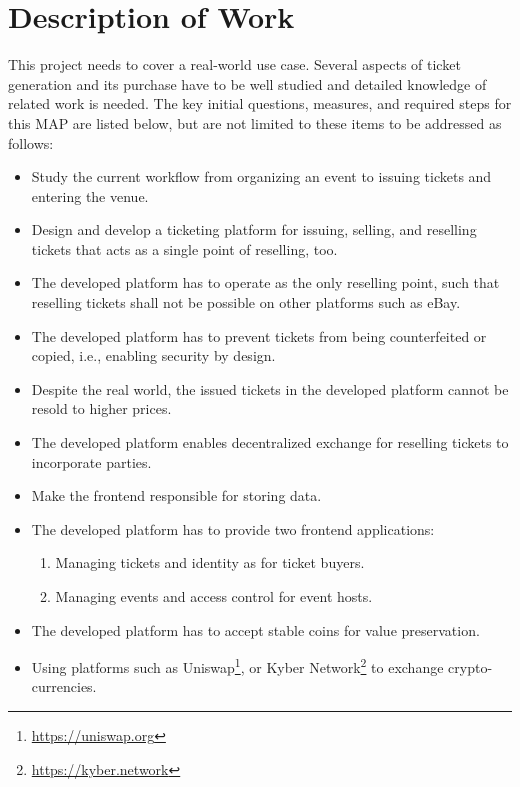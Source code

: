 \section{Description of Work}\label{chapter:introduction:descriptionOfWork}


This project needs to cover a real-world use case. Several aspects of ticket generation and its purchase have to be well studied and detailed knowledge of related work is needed. The key initial questions, measures, and required steps for this MAP are listed below, but are not limited to these items to be addressed as follows:

\begin{itemize}
    \item Study the current workflow from organizing an event to issuing tickets and entering the venue.
    \item Design and develop a ticketing platform for issuing, selling, and reselling tickets that acts as a single point of reselling, too.
    \item The developed platform has to operate as the only reselling point, such that reselling tickets shall not be possible on other platforms such as eBay.
    \item The developed platform has to prevent tickets from being counterfeited or copied, i.e., enabling security by design.
    \item Despite the real world, the issued tickets in the developed platform cannot be resold to higher prices.
    \item The developed platform enables decentralized exchange for reselling tickets to incorporate parties.
    \item Make the frontend responsible for storing data.
    \item The developed platform has to provide two frontend applications:
    \begin{enumerate}
        \item Managing tickets and identity as for ticket buyers.
        \item Managing events and access control for event hosts.
    \end{enumerate}
    \item The developed platform has to accept stable coins for value preservation.
    \item Using platforms such as Uniswap\footnote{\href{https://uniswap.org}{https://uniswap.org}}, or Kyber Network\footnote{\href{https://kyber.network}{https://kyber.network}} to exchange crypto-currencies.

\end{itemize}
